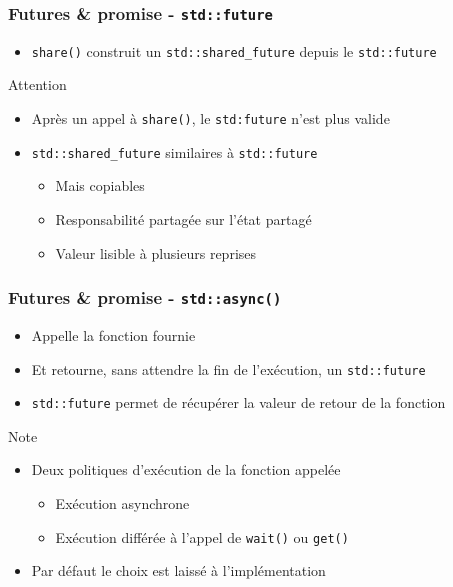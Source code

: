 \documentclass[C++.tex]{subfiles}
\begin{document}
\begin{frame}[fragile]
	\frametitle{Futures \& promise - \lstinline|std::future|}
	\begin{itemize}
		\item \lstinline|share()| construit un \lstinline|std::shared_future| depuis le \lstinline|std::future|
	\end{itemize}

	\begin{alertblock}{Attention}
		\begin{itemize}
			\item Après un appel à \lstinline|share()|, le \lstinline|std:future| n'est plus valide
		\end{itemize}
	\end{alertblock}

	\begin{itemize}
		\item \lstinline|std::shared_future| similaires à \lstinline|std::future|
		\begin{itemize}
			\item Mais copiables
			\item Responsabilité partagée sur l'état partagé
			\item Valeur lisible à plusieurs reprises
		\end{itemize}
	\end{itemize}
\end{frame}

\begin{frame}[fragile]
	\frametitle{Futures \& promise - \lstinline|std::async()|}
	\begin{itemize}
		\item Appelle la fonction fournie
		\item Et retourne, sans attendre la fin de l'exécution, un \lstinline|std::future|
		\item \lstinline|std::future| permet de récupérer la valeur de retour de la fonction
	\end{itemize}

	\begin{block}{Note}
		\begin{itemize}
			\item Deux politiques d'exécution de la fonction appelée
			\begin{itemize}
				\item Exécution asynchrone
				\item Exécution différée à l'appel de \lstinline|wait()| ou \lstinline|get()|
			\end{itemize}
			\item Par défaut le choix est laissé à l'implémentation
		\end{itemize}
	\end{block}
\end{frame}
\end{document}

